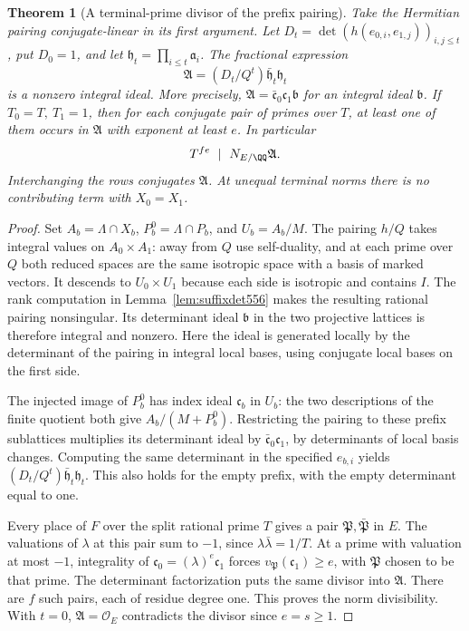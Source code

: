 \documentclass[a4paper,11pt]{article}
\newtheorem{theorem}[proposition]{Theorem}
\theoremstyle{definition}
\theoremstyle{remark}
\numberwithin{equation}{section}
\begin{document}
\begin{theorem}[A terminal-prime divisor of the prefix pairing]
\leavevmode\label{thm:terminaldivisor556}
Take the Hermitian pairing conjugate-linear in its first argument.
Let \(D_t=\det(h(e_{0,i},e_{1,j}))_{i,j\le t}\), put \(D_0=1\),
and let \(\mathfrak h_t=\prod_{i\le t}\mathfrak a_i\).
The fractional expression
\[
       \mathfrak A=(D_t/Q^t)\bar{\mathfrak h}_t\mathfrak h_t
\]
is a nonzero integral ideal. More precisely,
\(\mathfrak A=\bar{\mathfrak c}_0\mathfrak c_1\mathfrak b\)
for an integral ideal \(\mathfrak b\).
If \(T_0=T,\ T_1=1\), then for each conjugate pair of primes
over \(T\), at least one of them occurs in \(\mathfrak A\) with
exponent at least \(e\). In particular
\[
               T^{fe}\ \mid\ N_{E/\QQ}\mathfrak A .
\]
Interchanging the rows conjugates \(\mathfrak A\). At unequal
terminal norms there is no contributing term with \(X_0=X_1\).
\end{theorem}
\begin{proof}
Set \(A_b=\Lambda\cap X_b\), \(P_b^0=\Lambda\cap P_b\), and
\(U_b=A_b/M\). The pairing \(h/Q\) takes integral values on
\(A_0\times A_1\): away from \(Q\) use self-duality, and at
each prime over \(Q\) both reduced spaces are the same
isotropic space with a basis of marked vectors. It descends
to \(U_0\times U_1\) because each side is isotropic and
contains \(I\). The rank computation in
Lemma~\ref{lem:suffixdet556} makes the resulting rational
pairing nonsingular. Its determinant ideal \(\mathfrak b\)
in the two projective lattices is therefore integral and
nonzero. Here the ideal is generated locally by the determinant
of the pairing in integral local bases, using conjugate local
bases on the first side.

The injected image of \(P_b^0\) has index ideal
\(\mathfrak c_b\) in \(U_b\): the two descriptions of the
finite quotient both give \(A_b/(M+P_b^0)\). Restricting the
pairing to these prefix sublattices multiplies its determinant
ideal by \(\bar{\mathfrak c}_0\mathfrak c_1\), by determinants
of local basis changes. Computing the same determinant in the
specified \(e_{b,i}\) yields
\((D_t/Q^t)\bar{\mathfrak h}_t\mathfrak h_t\).
This also holds for the empty prefix, with the empty
determinant equal to one.

Every place of \(F\) over the split rational prime \(T\)
gives a pair \(\mathfrak P,\bar{\mathfrak P}\) in \(E\).
The valuations of \(\lambda\) at this pair sum to \(-1\),
since \(\lambda\bar\lambda=1/T\). At a prime with valuation
at most \(-1\), integrality of
\(\mathfrak c_0=(\lambda)^e\mathfrak c_1\) forces
\(v_{\mathfrak P}(\mathfrak c_1)\ge e\), with \(\mathfrak P\)
chosen to be that prime. The determinant factorization puts
the same divisor into \(\mathfrak A\). There are \(f\) such
pairs, each of residue degree one. This proves the norm
divisibility. With \(t=0\), \(\mathfrak A=\mathcal O_E\)
contradicts the divisor since \(e=s\ge1\).
\end{proof}
\end{document}
